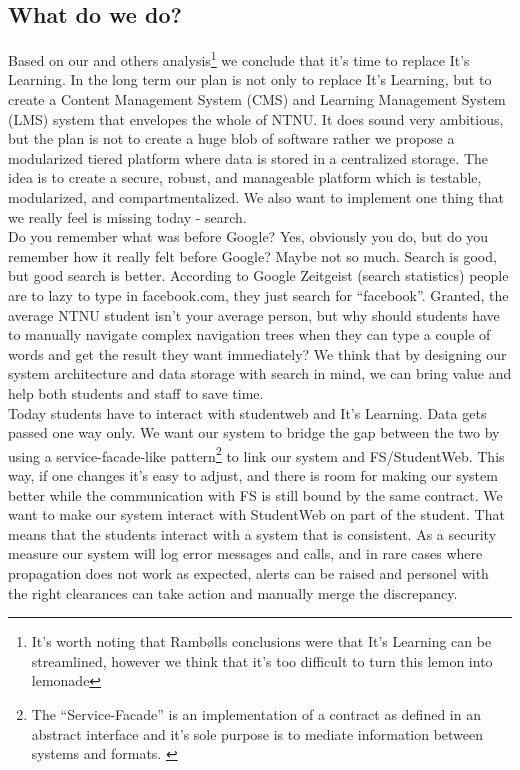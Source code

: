 \subsection{What do we do?}
Based on our and others analysis\footnote{It's worth noting that Rambølls conclusions were that It's Learning can be streamlined, 
however we think that it's too difficult to turn this lemon into lemonade} 
\cite{lmsstrat} we conclude that it's time to replace It's Learning. In the long term our plan is not only to replace It's 
Learning, but to create
a Content Management System (CMS) and Learning Management System (LMS) system that envelopes the whole of NTNU. It does sound very ambitious, but the plan is not to create a huge blob of software rather we propose a modularized tiered  
platform where data is stored in a centralized storage. The idea is to create a secure, robust, and manageable platform which is 
testable, modularized, and compartmentalized.
We also want to implement one thing that we really feel is missing today - search. \\

\noindent
Do you remember what was before Google? Yes, obviously you do, but do you remember how it really felt before Google? Maybe not so much. Search is good, but good search is better. 
According to Google Zeitgeist (search statistics) \cite{google:zeitgeist} people are to lazy to type in facebook.com, they just search for ``facebook''. Granted, the average NTNU 
student isn't your average person, but why should students have to manually navigate complex navigation trees when they can type a couple of words and get the result they want 
immediately? We think that by designing our system architecture and data storage with search in mind, we can bring value and help both students and staff to save time.\\

\noindent
Today students have to interact with studentweb and It's Learning. Data gets passed one way only. We want our system to bridge the gap between the two by using a 
service-facade-like pattern\footnote{The ``Service-Facade'' is an implementation of a contract as defined in an abstract interface and it's sole purpose is to mediate information between systems and formats. \cite{eepatterns}}
to link our system and FS/StudentWeb. This way, if one changes it's easy to adjust, and there is room for making our system better while the communication with FS is still bound by 
the same contract. We want to make our system interact with StudentWeb on part of the student. That means that the students interact with a system that is consistent. As a security 
measure our system will log error messages and calls, and in rare cases where propagation does not work as expected, alerts can be raised and personel with the right clearances can 
take action and manually merge the discrepancy. %
